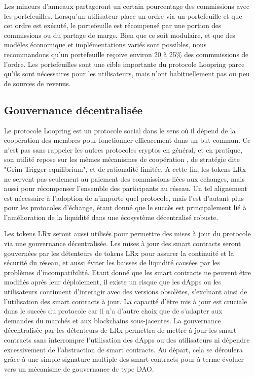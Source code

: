 \documentclass[UTF8,nofonts]{article}
\begin{document}
\begin{multicols}{2}
Les mineurs d'anneaux partageront un certain pourcentage des commissions avec les portefeuilles. Lorsqu'un utilisateur place un ordre via un portefeuille et que cet ordre est exécuté, le portefeuille est récompensé par une portion des commissions ou du partage de marge. Bien que ce soit modulaire, et que des modèles économique et implémentations variés sont possibles, nous recommandons qu'un portefeuille reçoive environ 20 à 25\% des commmissions de l'ordre. Les portefeuilles sont une cible importante du protocole Loopring parce qu'ils sont nécessaires pour les utilisateurs, mais n'ont habituellement pas ou peu de sources de revenus.

\subsection{Gouvernance décentralisée}
Le protocole Loopring est un protocole social dans le sens où il dépend de la coopération des membres pour fonctionner efficacement dans un but commun. Ce n'est pas sans rappeler les autres protocoles cryptos en général, et en pratique, son utilité repose sur les mêmes mécanismes de coopération \cite{vitalikgovernance}, de stratégie dite "Grim Trigger equilibrium", et de rationalité limitée. A cette fin, les tokens LRx ne servent pas seulement au paiement des commissions liées aux échanges, mais aussi pour récompenser l'ensemble des participants au réseau. Un tel alignement est nécessaire à l'adoption de n'importe quel protocole, mais l'est d'autant plus pour les protocoles d'échange, étant donné que le succès est principalement lié à l'amélioration de la liquidité dans une écosystème décentralisé robuste.

Les tokens LRx seront aussi utilisés pour permettre des mises à jour du protocole via une gouvernance décentralisée. Les mises à jour des smart contracts seront gouvernées par les détenteurs de tokens LRx pour assurer la continuité et la sécurité du réseau, et aussi éviter les baisses de liquidité causées par les problèmes d'incompatibilité. Etant donné que les smart contracts ne peuvent être modifiés après leur déploiement, il existe un risque que les dApps ou les utilisateurs continuent d'interagir avec des versions obsolètes, s'excluant ainsi de l'utilisation des smart contracts à jour. La capacité d'être mis à jour est cruciale dans le succès du protocole car il n'a d'autre choix que de s'adapter aux demandes du marchés et aux blockchains sous-jacentes. La gouvernance décentralisée par les détenteurs de LRx permettra de mettre à jour les smart contracts sans interrompre l'utilisation des dApps ou des utilisateurs ni dépendre excessivement de l'abstraction de smart contracts. Au départ, cela se déroulera grâce à une simple signature multiple des smart contracts pour à terme évoluer vers un mécanisme de gouvernance de type DAO.


\end{multicols}
\end{document}
